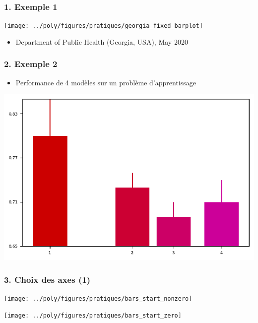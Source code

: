 \documentclass[sans,14pt]{beamer}
\begin{document}
{\begin{frame}
  \frametitle{1. Exemple 1}
  \begin{center}
    \texttt{[image: ../poly/figures/pratiques/georgia\_fixed\_barplot]}
  \end{center}
  \begin{itemize}
  \item[] \footnotesize{Department of Public Health (Georgia, USA), May 2020}
  \end{itemize}
\end{frame}

\begin{frame}
  \frametitle{2. Exemple 2}
  \begin{itemize}
  \item[] Performance de 4 modèles sur un problème d'apprentissage
  \end{itemize}
  \begin{center}
    \includegraphics[width=\textwidth]{figures/horrible_bar_plot}
  \end{center}
\end{frame}

\begin{frame}
  \frametitle{3. Choix des axes (1)}
  \begin{minipage}[h]{0.49\linewidth}
    \begin{center}
      \texttt{[image: ../poly/figures/pratiques/bars\_start\_nonzero]}
    \end{center}
  \end{minipage}%
  \pause
  \hfill
  \begin{minipage}[h]{0.49\linewidth}
    \begin{center}
      \texttt{[image: ../poly/figures/pratiques/bars\_start\_zero]}
    \end{center}
  \end{minipage}%
\end{frame}

}
\end{document}
